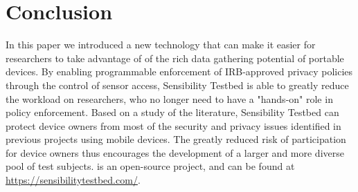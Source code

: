 \section{Conclusion}\label{sec-conclude}

In this paper we introduced a new technology that can make it easier for 
researchers to take advantage of of the rich data gathering potential of 
portable devices. By enabling programmable enforcement of IRB-approved privacy 
policies through the control of sensor access, Sensibility Testbed is able to greatly 
reduce the workload on researchers, who no longer need to have a "hands-on"
role in policy enforcement. Based on a study of the literature, Sensibility Testbed
can protect device owners from most of the security and privacy issues identified
in previous projects using mobile devices. The greatly reduced risk of participation
for device owners thus encourages the development of a larger and more diverse pool 
of test subjects. \sysname is an open-source project, and can be found at
\url{https://sensibilitytestbed.com/}.